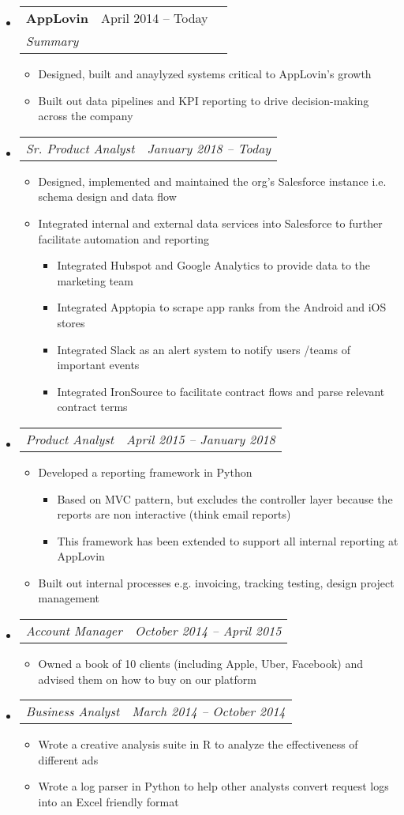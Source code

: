 \documentclass[draft]{article}
\newcommand{\resumeheading}[1]{
    \noindent
    \fcolorbox{mygrey}{mygrey}{%
        \parbox{\dimexpr\linewidth-2\fboxsep-2\fboxrule}{\large#1}}
}
\newcommand{\splitresumesubheading}[3]{
    \begin{tabularx}{\linewidth}{XcX}
	    	\textbf{#1} & #2 \\
		    \textit{#3}
    \end{tabularx}
    \vspace{-3ex}
}
\newcommand{\resumesubsubheading}[2]{
    \begin{tabularx}{\linewidth}{Xc}
		\textit{#1} & \textit{#2} \\
    \end{tabularx}
    \vspace{-4ex}
}
\newcommand{\resumeitem}[1]{
    \item #1 
    \vspace{-2pt}
}
\begin{document}
\resumeheading{Experience}
\begin{itemize}
    \item \splitresumesubheading{AppLovin}{April 2014 -- Today}
                                {Summary}
    \begin{itemize}
        \resumeitem{Designed, built and anaylyzed systems critical to AppLovin's growth}
        \resumeitem{Built out data pipelines and KPI reporting to drive decision-making across the company}
    \end{itemize}
    \item \resumesubsubheading{Sr. Product Analyst}{January 2018 -- Today}
    \begin{itemize}
        \resumeitem{Designed, implemented and maintained the org’s Salesforce instance i.e. schema design and data flow}
        \resumeitem{Integrated internal and external data services into Salesforce to further facilitate automation and reporting}
        \vspace{-3ex}
        \begin{itemize}
            \resumeitem{Integrated Hubspot and Google Analytics to provide data to the marketing team}
            \resumeitem{Integrated Apptopia to scrape app ranks from the Android and iOS stores}
            \resumeitem{Integrated Slack as an alert system to notify users /teams of important events}
            \resumeitem{Integrated IronSource to facilitate contract flows and parse relevant contract terms}
        \end{itemize}
    \end{itemize}
    \item \resumesubsubheading{Product Analyst}{April 2015 -- January 2018}
    \begin{itemize}
        \resumeitem{Developed a reporting framework in Python}
        \begin{itemize}
            \resumeitem{Based on MVC pattern, but excludes the controller layer because the reports are non interactive (think email reports)}
            \resumeitem{This framework has been extended to support all internal reporting at AppLovin}
        \end{itemize}
        \resumeitem{Built out internal processes e.g. invoicing, tracking testing, design project management}
    \end{itemize}
    \item \resumesubsubheading{Account Manager}{October 2014 -- April 2015}
    \begin{itemize}
        \resumeitem{Owned a book of 10 clients (including Apple, Uber, Facebook) and advised them on how to buy on our platform}
    \end{itemize}
    \item \resumesubsubheading{Business Analyst}{March 2014 -- October 2014}
    \begin{itemize}
        \resumeitem{Wrote a creative analysis suite in R to analyze the effectiveness of different ads}
        \resumeitem{Wrote a log parser in Python to help other analysts convert request logs into an Excel friendly format}
    \end{itemize}
\end{itemize}
\end{document}
